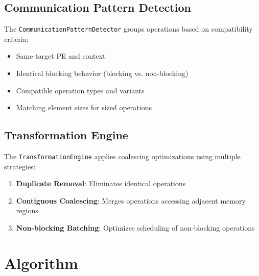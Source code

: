 \documentclass{article}
\begin{document}
\subsection{Communication Pattern Detection}
The \texttt{CommunicationPatternDetector} groups operations based on compatibility criteria:
\begin{itemize}
\item Same target PE and context
\item Identical blocking behavior (blocking vs. non-blocking)
\item Compatible operation types and variants
\item Matching element sizes for sized operations
\end{itemize}

\subsection{Transformation Engine}
The \texttt{TransformationEngine} applies coalescing optimizations using multiple strategies:
\begin{enumerate}
\item \textbf{Duplicate Removal}: Eliminates identical operations
\item \textbf{Contiguous Coalescing}: Merges operations accessing adjacent memory regions
\item \textbf{Non-blocking Batching}: Optimizes scheduling of non-blocking operations
\end{enumerate}

\section{Algorithm}
\end{document}
